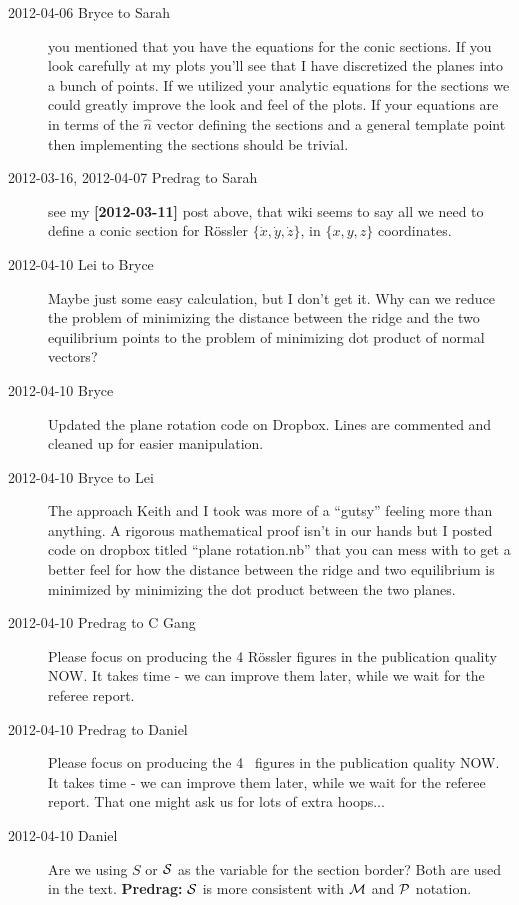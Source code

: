 \begin{description}
\item[2012-04-06 Bryce to Sarah]
you mentioned that you have the equations for the conic sections.
If you look carefully at my plots you'll see that I have discretized the
planes into a bunch of points. If we utilized  your analytic equations
for the sections we could greatly improve the look and feel of the plots.
If your equations are in terms of the $\hat{n}$ vector defining the
sections and a general template point then implementing the sections
should be trivial.

\item[2012-03-16, 2012-04-07 Predrag to Sarah] see my {\bf [2012-03-11]}
post above, that wiki seems to say all we need to define a conic section
for R\"ossler $\{\dot{x},\dot{y},\dot{z}\}$, in $\{x,y,z\}$ coordinates.


\item[2012-04-10 Lei to Bryce] Maybe just some easy calculation, but I
don't get it. Why can we reduce the problem of minimizing the distance
between the ridge and the two equilibrium points to the problem of
minimizing dot product of normal vectors?

\item[2012-04-10 Bryce] Updated the plane rotation code on Dropbox. Lines
are commented and cleaned up for easier manipulation.

\item[2012-04-10 Bryce to Lei] The approach Keith and I took was more of
a ``gutsy'' feeling more than anything. A rigorous mathematical proof
isn't in our hands but I posted code on dropbox titled ``plane
rotation.nb'' that you can mess with to get a better feel for how the
distance between the ridge and two equilibrium is minimized by minimizing
the dot product between the two planes.

\item[2012-04-10 Predrag to C Gang]
Please focus on producing the 4 R\"ossler figures in the publication quality NOW.
It takes time - we can improve them later, while we wait for the referee report.

\item[2012-04-10 Predrag to Daniel]
Please focus on producing the 4 \cLe\ figures in the publication quality NOW.
It takes time - we can improve them later, while we wait for the referee report.
That one might ask us for lots of extra hoops...

\item[2012-04-10 Daniel] Are we using $S$ or ${\cal S}$ as the variable
for the section border? Both are used in the text.
{\bf Predrag:} ${\cal S}$ is more consistent with ${\cal M}$ and ${\cal P}$
notation.


\end{description}
